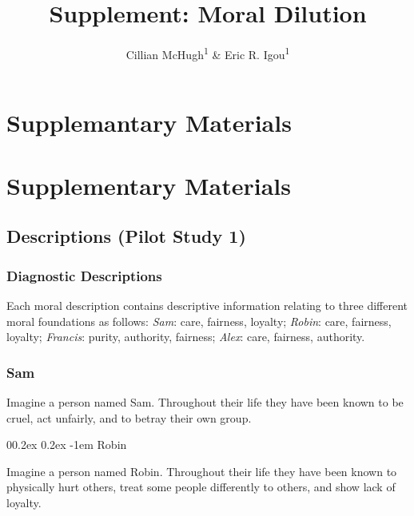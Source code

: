 \documentclass[
  american,
  man,floatsintext]{apa7}
\title{Supplement: Moral Dilution}
\author{Cillian McHugh\textsuperscript{1} \& Eric R. Igou\textsuperscript{1}}
\date{}
\affiliation{\vspace{0.5cm}\textsuperscript{1} University of Limerick}
\makeatletter
\let\oldparagraph\paragraph
\renewcommand{\paragraph}[1]{\oldparagraph{#1}\mbox{}}
\renewcommand{\paragraph}{\@startsection{paragraph}{4}{\parindent}%
  {0\baselineskip \@plus 0.2ex \@minus 0.2ex}%
  {-1em}%
  {\normalfont\normalsize\bfseries\itshape\typesectitle}}
\makeatother
\begin{document}
\maketitle

\hypertarget{supplemantary-materials}{%
\section{Supplemantary Materials}\label{supplemantary-materials}}

\newpage

\hypertarget{supplementary-materials}{%
\section{Supplementary Materials}\label{supplementary-materials}}

\hypertarget{descriptions-pilot-study-1}{%
\subsection{Descriptions (Pilot Study 1)}\label{descriptions-pilot-study-1}}

\hypertarget{diagnostic-descriptions}{%
\subsubsection{Diagnostic Descriptions}\label{diagnostic-descriptions}}

Each moral description contains descriptive information relating to three different moral foundations as follows: \emph{Sam}: care, fairness, loyalty; \emph{Robin}: care, fairness, loyalty; \emph{Francis}: purity, authority, fairness; \emph{Alex}: care, fairness, authority.

\hypertarget{sam}{%
\subsubsection{Sam}\label{sam}}

Imagine a person named Sam.
Throughout their life they have been known to be cruel, act unfairly, and to betray their own group.

\hypertarget{robin}{%
\paragraph{Robin}\label{robin}}

Imagine a person named Robin.
Throughout their life they have been known to physically hurt others, treat some people differently to others, and show lack of loyalty.
\end{document}
